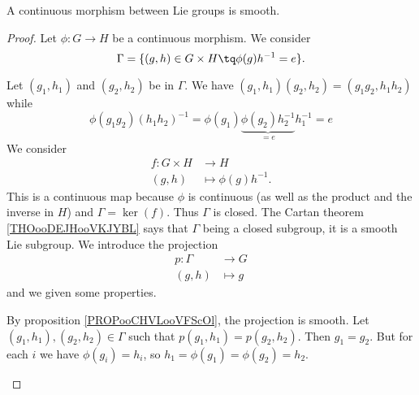 \begin{proposition}
    A continuous morphism between Lie groups is smooth.
\end{proposition}

\begin{proof}
    Let \( \phi\colon G\to H\) be a continuous morphism. We consider
    \begin{equation}
        \Gamma=\{ (g,h)\in G\times H\tq \phi(g)h^{-1}=e \}.
    \end{equation}
    \begin{subproof}
        Let \( (g_1,h_1)\) and \( (g_2,h_2)\) be in \( \Gamma\). We have \( (g_1,h_1)(g_2,h_2)=(g_1g_2,h_1h_2)\) while
        \begin{equation}
            \phi(g_1g_2)(h_1h_2)^{-1}=\phi(g_1)\underbrace{\phi(g_2)h_2^{-1}}_{=e}h_1^{-1}=e
        \end{equation}
        We consider
        \begin{equation}
            \begin{aligned}
                f\colon G\times H&\to H \\
                (g,h)&\mapsto \phi(g)h^{-1}. 
            \end{aligned}
        \end{equation}
        This is a continuous map because \( \phi\) is continuous (as well as the product and the inverse in \( H\)) and \( \Gamma=\ker(f)\). Thus \( \Gamma\) is closed.
        The Cartan theorem \ref{THOooDEJHooVKJYBL} says that \( \Gamma\) being a closed subgroup, it is a smooth Lie subgroup.
        We introduce the projection
        \begin{equation}
            \begin{aligned}
                p\colon \Gamma&\to G \\
                (g,h)&\mapsto g
            \end{aligned}
        \end{equation}
        and we given some properties.
        \begin{subproof}
        \spitem[Smooth]
            By proposition \ref{PROPooCHVLooVFScOl}, the projection is smooth.
        \spitem[Bijective]
            Let \( (g_1,h_1),(g_2,h_2)\in \Gamma\) such that \( p(g_1,h_1)=p(g_2,h_2)\). Then \( g_1=g_2\). But for each \( i\) we have \( \phi(g_i)=h_i\), so \( h_1=\phi(g_1)=\phi(g_2)=h_2\).

\end{subproof}
\end{subproof}
\end{proof}
